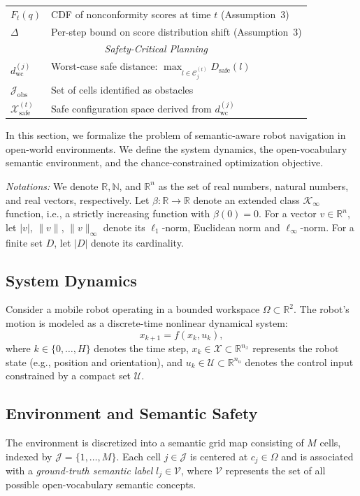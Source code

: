 \documentclass[letterpaper, 10 pt, conference]{ieeeconf}  %
\begin{document}
\begin{table}[h]
\begin{tabular}{l l}
$F_t(q)$ & CDF of nonconformity scores at time $t$ (Assumption~3) \\
$\Delta$ & Per-step bound on score distribution shift (Assumption~3) \\
\hline
\multicolumn{2}{c}{\textit{Safety-Critical Planning}} \\
$d_{\text{wc}}^{(j)}$ & Worst-case safe distance: $\max_{l \in \mathcal{C}_j^{(t)}} D_{\text{safe}}(l)$ \\
$\mathcal{J}_{\text{obs}}$ & Set of cells identified as obstacles \\
$\mathcal{X}_{\text{safe}}^{(t)}$ & Safe configuration space derived from $d_{\text{wc}}^{(j)}$ \\
\hline
\end{tabular}
\end{table}

In this section, we formalize the problem of semantic-aware robot navigation in open-world environments. We define the system dynamics, the open-vocabulary semantic environment, and the chance-constrained optimization objective.

\emph{Notations: }We denote $\mathbb{R}, \mathbb{N}$, and $\mathbb{R}^n$ as the set of real numbers, natural numbers, and real vectors, respectively. 
Let $\beta: \mathbb{R} \rightarrow \mathbb{R}$ denote an extended class $\mathcal{K}_{\infty}$ function, i.e., a strictly increasing function with $\beta(0)=0$. 
For a vector $v \in \mathbb{R}^n$, let $|v|$, $\|v\|$, $\|v\|_\infty$ denote its $\ell_1$-norm, Euclidean norm and $\ell_\infty$-norm. 
For a finite set $D$, let $|D|$ denote its cardinality.




\subsection{System Dynamics}
Consider a mobile robot operating in a bounded workspace $\Omega \subset \mathbb{R}^2$. The robot's motion is modeled as a discrete-time nonlinear dynamical system:
\begin{equation}
    x_{k+1} = f(x_k, u_k),
\end{equation}
where $k \in \{0, \dots, H\}$ denotes the time step, $x_k \in \mathcal{X} \subset \mathbb{R}^{n_x}$ represents the robot state (e.g., position and orientation), and $u_k \in \mathcal{U} \subset \mathbb{R}^{n_u}$ denotes the control input constrained by a compact set $\mathcal{U}$.

\subsection{Environment and Semantic Safety}
The environment is discretized into a semantic grid map consisting of $M$ cells, indexed by $\mathcal{J} = \{1, \dots, M\}$. Each cell $j \in \mathcal{J}$ is centered at $c_j \in \Omega$ and is associated with a \textit{ground-truth semantic label} $l_j \in \mathcal{V}$, where $\mathcal{V}$ represents the set of all possible open-vocabulary semantic concepts.
\end{document}
